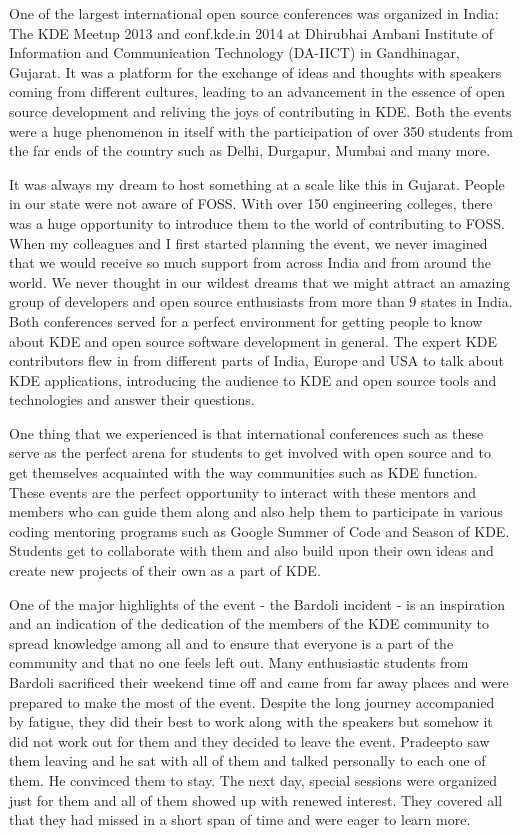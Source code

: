 
\noindent{}One of the largest international open source conferences was organized in India: The KDE Meetup 2013 and conf.kde.in 2014 at Dhirubhai Ambani Institute of Information and Communication Technology (DA-IICT) in Gandhinagar, Gujarat. It was a platform for the exchange of ideas and thoughts with speakers coming from different cultures, leading to an advancement in the essence of open source development and reliving the joys of contributing in KDE. Both the events were a huge phenomenon in itself with the participation of over 350 students from the far ends of the country such as Delhi, Durgapur, Mumbai and many more. 

It was always my dream to host something at a scale like this in Gujarat. People in our state were not aware of FOSS. With over 150 engineering colleges, there was a huge opportunity to introduce them to the world of contributing to FOSS. When my colleagues and I first started planning the event, we never imagined that we would receive so much support from across India and from around the world. We never thought in our wildest dreams that we might attract an amazing group of developers and open source enthusiasts from more than 9 states in India. Both conferences served for a perfect environment for getting people to know about KDE and open source software development in general. The expert KDE contributors flew in from different parts of India, Europe and USA to talk about KDE applications, introducing the audience to KDE and open source tools and technologies and answer their questions.

One thing that we experienced is that international conferences such as these serve as the perfect arena for students to get involved with open source and to get themselves acquainted with the way communities such as KDE function. These events are the perfect opportunity to interact with these mentors and members who can guide them along and also help them to participate in various coding mentoring programs such as Google Summer of Code and Season of KDE. Students get to collaborate with them and also build upon their own ideas and create new projects of their own as a part of KDE.

One of the major highlights of the event - the Bardoli incident - is an inspiration and an indication of the dedication of the members of the KDE community to spread knowledge among all and to ensure that everyone is a part of  the community and that no one feels left out. Many enthusiastic students from Bardoli sacrificed their weekend time off and came from far away places and were prepared to make the most of the event. Despite the long journey accompanied by fatigue, they did their best to work along with the speakers but somehow it did not work out for them and they decided to leave the event. Pradeepto saw them leaving and he sat with all of them and talked personally to each one of them. He convinced them to stay. The next day, special sessions were organized just for them and all of them showed up with renewed interest. They covered all that they had missed in a short span of time and were eager to learn more.

